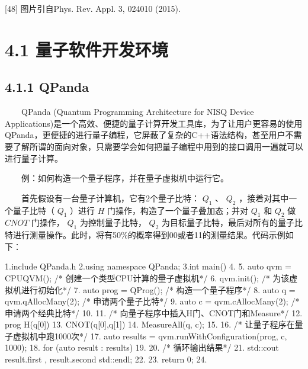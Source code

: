 \documentclass[a4paper,11pt,english]{sphinxmanual}
\begin{document}
\sphinxAtStartPar
{[}48{]} 图片引自Phys. Rev. Appl. 3, 024010 (2015).

\sphinxstepscope


\section{4.1 量子软件开发环境}
\label{\detokenize{rst/4.1_u91cf_u5b50_u8f6f_u4ef6_u5f00_u53d1_u73af_u5883:id1}}\label{\detokenize{rst/4.1_u91cf_u5b50_u8f6f_u4ef6_u5f00_u53d1_u73af_u5883::doc}}

\subsection{4.1.1 QPanda}
\label{\detokenize{rst/4.1_u91cf_u5b50_u8f6f_u4ef6_u5f00_u53d1_u73af_u5883:qpanda}}
\sphinxAtStartPar
  QPanda (Quantum Programming Architecture for NISQ Device Applications)是一个高效、便捷的量子计算开发工具库，为了让用户更容易的使用QPanda，更便捷的进行量子编程，它屏蔽了复杂的C++语法结构，甚至用户不需要了解所谓的面向对象，只需要学会如何把量子编程中用到的接口调用一遍就可以进行量子计算。

\sphinxAtStartPar
  例：如何构造一个量子程序，并在量子虚拟机中运行它。

\sphinxAtStartPar
  首先假设有一台量子计算机，它有2个量子比特： \(Q_1\) 、 \(Q_2\) ，接着对其中一个量子比特（ \(Q_1\) ）进行 \(H\) 门操作，构造了一个量子叠加态；并对 \(Q_1\) 和 \(Q_2\) 做 \(CNOT\) 门操作， \(Q_1\) 为控制量子比特， \(Q_2\) 为目标量子比特，最后对所有的量子比特进行测量操作。此时，将有50\%的概率得到00或者11的测量结果。代码示例如下：

\begin{sphinxVerbatim}[commandchars=\\\{\}]
1.\PYGZsh{}include \PYGZdq{}QPanda.h\PYGZdq{}
2.using namespace QPanda;
3.int main()
4.\PYGZob{}
5.    auto qvm = CPUQVM();              /* 创建一个类型CPU计算的量子虚拟机*/
6.    qvm.init();                       /* 为该虚拟机进行初始化*/
7.    auto prog = QProg();              /* 构造一个量子程序*/
8.    auto q = qvm.qAllocMany(2);       /* 申请两个量子比特*/
9.    auto c = qvm.cAllocMany(2);       /* 申请两个经典比特*/
10.
11.    /* 向量子程序中插入H门、CNOT门和Measure*/
12.    prog \PYGZlt{}\PYGZlt{} H(q[0])
13.          \PYGZlt{}\PYGZlt{} CNOT(q[0],q[1])
14.          \PYGZlt{}\PYGZlt{} MeasureAll(q, c);
15.
16.    /* 让量子程序在量子虚拟机中跑1000次*/
17.    auto results = qvm.runWithConfiguration(prog, c, 1000);
18.    for (auto result : results)
19.    \PYGZob{}
20.       /* 循环输出结果*/
21.       std::cout \PYGZlt{}\PYGZlt{} \PYGZdq{}result.first\PYGZdq{} \PYGZlt{}\PYGZlt{} \PYGZdq{}, \PYGZdq{} \PYGZlt{}\PYGZlt{} \PYGZdq{}result.second\PYGZdq{} \PYGZlt{}\PYGZlt{} std::endl;
22.    \PYGZcb{}
23.    return 0;
24.\PYGZcb{}
\end{sphinxVerbatim}
\end{document}
